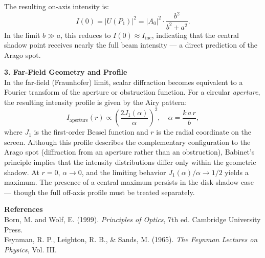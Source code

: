 \begin{technical}
The resulting on-axis intensity is:
\[
I(0) = |U(P_1)|^2 = |A_0|^2 \cdot \frac{b^2}{b^2 + a^2}.
\]
In the limit $b \gg a$, this reduces to $I(0) \approx I_{\text{inc}}$, indicating that the central shadow point receives nearly the full beam intensity — a direct prediction of the Arago spot.

\noindent\textbf{3. Far-Field Geometry and Profile}\\[0.5em]
In the far-field (Fraunhofer) limit, scalar diffraction becomes equivalent to a Fourier transform of the aperture or obstruction function. For a circular \textit{aperture}, the resulting intensity profile is given by the Airy pattern:
\[
I_{\text{aperture}}(r) \propto \left( \frac{2J_1(\alpha)}{\alpha} \right)^2, \quad \alpha = \frac{k\,a\,r}{b},
\]
where $J_1$ is the first-order Bessel function and $r$ is the radial coordinate on the screen. Although this profile describes the complementary configuration to the Arago spot (diffraction from an aperture rather than an obstruction), Babinet’s principle implies that the intensity distributions differ only within the geometric shadow. At $r = 0$, $\alpha \to 0$, and the limiting behavior $J_1(\alpha)/\alpha \to 1/2$ yields a maximum. The presence of a central maximum persists in the disk-shadow case — though the full off-axis profile must be treated separately.

\vspace{0.5em}
\noindent\textbf{References}\\
Born, M. and Wolf, E. (1999). \textit{Principles of Optics}, 7th ed. Cambridge University Press.\\
Feynman, R. P., Leighton, R. B., \& Sands, M. (1965). \textit{The Feynman Lectures on Physics}, Vol. III.
\end{technical}
